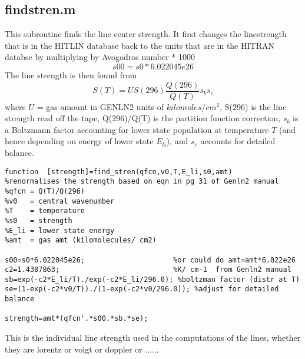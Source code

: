 \documentclass[11pt]{article}
\begin{document}
\subsection{findstren.m}

This subroutine finds the line center strength. It first changes the 
linestrength that is in the HITLIN database back to the units that are
in the HITRAN databse by multiplying by Avogadros number * 1000 
\begin{displaymath}
  s00=s0*6.022045e26
\end{displaymath}
The line strength is then found from 
\begin{displaymath}
S(T) = U S(296) \frac{Q(296)}{Q(T)} s_{b} s_{e}
\end{displaymath}
where $U$ = gas amount in GENLN2 units of $kilomoles/cm^{2}$, S(296) is the 
line strength read off the tape, Q(296)/Q(T) is the partition function 
correction, $s_{b}$ is a Boltzmann factor accounting for lower state 
population at 
temperature $T$ (and hence depending on energy of lower state $E_{li}$), and
$s_{e}$ accounts for detailed balance.

\begin{verbatim}
function  [strength]=find_stren(qfcn,v0,T,E_li,s0,amt)
%renormalises the strength based on eqn in pg 31 of Genln2 manual
%qfcn = Q(T)/Q(296)
%v0   = central wavenumber
%T    = temperature
%s0   = strength
%E_li = lower state energy
%amt  = gas amt (kilomolecules/ cm2)

s00=s0*6.022045e26;                     %or could do amt=amt*6.022e26
c2=1.4387863;                           %K/ cm-1  from Genln2 manual
sb=exp(-c2*E_li/T)./exp(-c2*E_li/296.0); %boltzman factor (distr at T)
se=(1-exp(-c2*v0/T))./(1-exp(-c2*v0/296.0)); %adjust for detailed balance

strength=amt*(qfcn'.*s00.*sb.*se);
\end{verbatim}

This is the individual line strength used in the computations of the lines,
whether they are lorentz or voigt or doppler or ......



\end{document}
